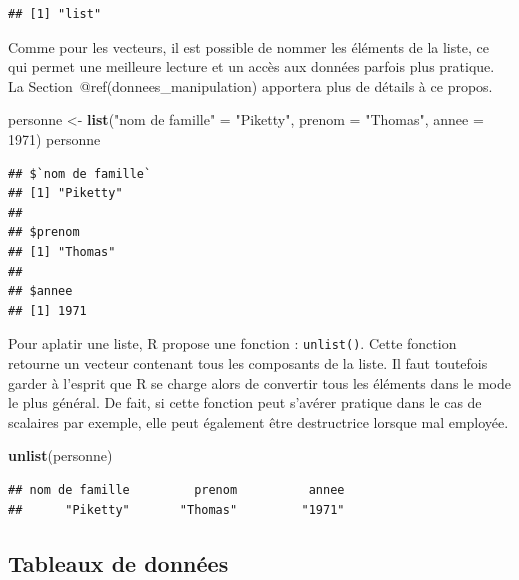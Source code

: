 \documentclass[
  11pt,
]{book}
\newenvironment{Shaded}{\begin{snugshade}}{\end{snugshade}}
\newcommand{\DataTypeTok}[1]{\textcolor[rgb]{0.13,0.29,0.53}{#1}}
\newcommand{\DecValTok}[1]{\textcolor[rgb]{0.00,0.00,0.81}{#1}}
\newcommand{\KeywordTok}[1]{\textcolor[rgb]{0.13,0.29,0.53}{\textbf{#1}}}
\newcommand{\NormalTok}[1]{#1}
\newcommand{\StringTok}[1]{\textcolor[rgb]{0.31,0.60,0.02}{#1}}
\numberwithin{equation}{section}
\numberwithin{countremarque}{section}
\begin{document}
\begin{lstlisting}
## [1] "list"
\end{lstlisting}

Comme pour les vecteurs, il est possible de nommer les éléments de la liste, ce qui permet une meilleure lecture et un accès aux données parfois plus pratique. La Section~@ref(donnees\_manipulation) apportera plus de détails à ce propos.

\begin{Shaded}
\begin{Highlighting}[]
\NormalTok{personne \textless{}{-}}\StringTok{ }\KeywordTok{list}\NormalTok{(}\StringTok{"nom de famille"}\NormalTok{ =}\StringTok{ "Piketty"}\NormalTok{,}
                 \DataTypeTok{prenom =} \StringTok{"Thomas"}\NormalTok{,}
                 \DataTypeTok{annee =} \DecValTok{1971}\NormalTok{)}
\NormalTok{personne}
\end{Highlighting}
\end{Shaded}

\begin{lstlisting}
## $`nom de famille`
## [1] "Piketty"
## 
## $prenom
## [1] "Thomas"
## 
## $annee
## [1] 1971
\end{lstlisting}

Pour aplatir une liste, R propose une fonction : \texttt{unlist()}. Cette fonction retourne un vecteur contenant tous les composants de la liste. Il faut toutefois garder à l'esprit que R se charge alors de convertir tous les éléments dans le mode le plus général. De fait, si cette fonction peut s'avérer pratique dans le cas de scalaires par exemple, elle peut également être destructrice lorsque mal employée.

\begin{Shaded}
\begin{Highlighting}[]
\KeywordTok{unlist}\NormalTok{(personne)}
\end{Highlighting}
\end{Shaded}

\begin{lstlisting}
## nom de famille         prenom          annee 
##      "Piketty"       "Thomas"         "1971"
\end{lstlisting}

\hypertarget{tableaux-de-donnuxe9es}{%
\subsection{Tableaux de données}\label{tableaux-de-donnuxe9es}}
\end{document}
